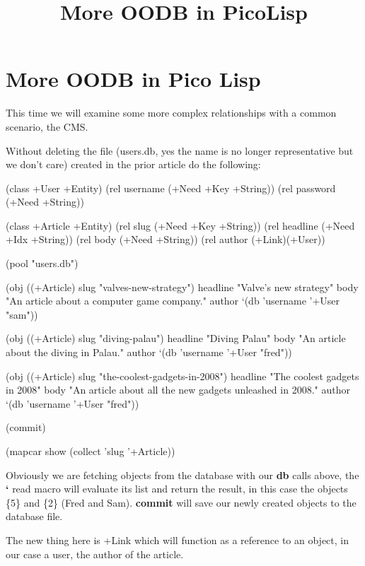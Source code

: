 \title*{More OODB in PicoLisp}

\maketitle

\section{More OODB in Pico Lisp}
\label{sec:more-oodb}

This time we will examine some more complex relationships with a common
scenario, the CMS.

Without deleting the file (users.db, yes the name is no longer
representative but we don't care) created in the prior article do the
following:


\begin{wideverbatim}
(class +User +Entity)
(rel username (+Need +Key +String))
(rel password (+Need +String))

(class +Article +Entity)
(rel slug     (+Need +Key +String))
(rel headline (+Need +Idx +String))
(rel body     (+Need +String))
(rel author   (+Link)(+User))

(pool "users.db")

(obj ((+Article) slug "valves-new-strategy") 
     headline "Valve's new strategy" 
     body "An article about a computer game company." 
     author `(db 'username '+User "sam"))

(obj ((+Article) slug "diving-palau") 
     headline "Diving Palau" 
     body "An article about the diving in Palau." 
     author `(db 'username '+User "fred"))

(obj ((+Article) slug "the-coolest-gadgets-in-2008") 
     headline "The coolest gadgets in 2008" 
     body "An article about all the new gadgets unleashed in 2008." 
     author `(db 'username '+User "fred"))

(commit)

(mapcar show (collect 'slug '+Article))
\end{wideverbatim}

Obviously we are fetching objects from the database with our \textbf{db} calls
above, the \textbf{`} read macro will evaluate its list and return the result,
in this case the objects \{5\} and \{2\} (Fred and Sam). \textbf{commit} will save
our newly created objects to the database file.

The new thing here is +Link which will function as a reference to an
object, in our case a user, the author of the article.

